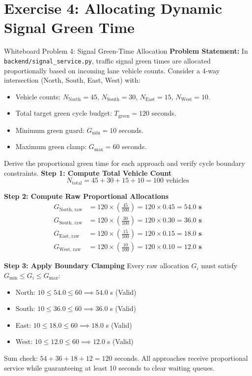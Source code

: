 \documentclass[11pt,a4paper,oneside]{report}
\begin{document}
\section{Exercise 4: Allocating Dynamic Signal Green Time}
\label{sec:wb_signal}

\begin{interviewq}{Whiteboard Problem 4: Signal Green-Time Allocation}
\textbf{Problem Statement:}
In \texttt{backend/signal\_service.py}, traffic signal green times are allocated proportionally based on incoming lane vehicle counts. Consider a 4-way intersection (North, South, East, West) with:
\begin{itemize}
    \item Vehicle counts: $N_{\text{North}} = 45$, $N_{\text{South}} = 30$, $N_{\text{East}} = 15$, $N_{\text{West}} = 10$.
    \item Total target green cycle budget: $T_{\text{green}} = 120$ seconds.
    \item Minimum green guard: $G_{\min} = 10$ seconds.
    \item Maximum green clamp: $G_{\max} = 60$ seconds.
\end{itemize}
Derive the proportional green time for each approach and verify cycle boundary constraints.
\tcblower
\textbf{Step 1: Compute Total Vehicle Count}
\begin{equation*}
N_{\text{total}} = 45 + 30 + 15 + 10 = 100 \text{ vehicles}
\end{equation*}

\textbf{Step 2: Compute Raw Proportional Allocations}
\begin{align*}
G_{\text{North, raw}} &= 120 \times \left(\frac{45}{100}\right) = 120 \times 0.45 = \mathbf{54.0 \text{ s}} \\
G_{\text{South, raw}} &= 120 \times \left(\frac{30}{100}\right) = 120 \times 0.30 = \mathbf{36.0 \text{ s}} \\
G_{\text{East, raw}}  &= 120 \times \left(\frac{15}{100}\right) = 120 \times 0.15 = \mathbf{18.0 \text{ s}} \\
G_{\text{West, raw}}  &= 120 \times \left(\frac{10}{100}\right) = 120 \times 0.10 = \mathbf{12.0 \text{ s}}
\end{align*}

\textbf{Step 3: Apply Boundary Clamping}
Every raw allocation $G_i$ must satisfy $G_{\min} \le G_i \le G_{\max}$:
\begin{itemize}
    \item North: $10 \le 54.0 \le 60 \implies 54.0$ s (Valid)
    \item South: $10 \le 36.0 \le 60 \implies 36.0$ s (Valid)
    \item East: $10 \le 18.0 \le 60 \implies 18.0$ s (Valid)
    \item West: $10 \le 12.0 \le 60 \implies 12.0$ s (Valid)
\end{itemize}
Sum check: $54 + 36 + 18 + 12 = 120$ seconds. All approaches receive proportional service while guaranteeing at least 10 seconds to clear waiting queues.
\end{interviewq}
\end{document}
